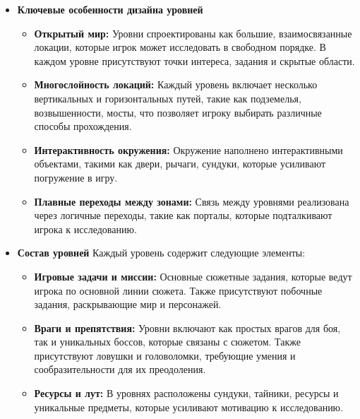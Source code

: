 \documentclass{article}
\begin{document}
\begin{itemize}
 \item \textbf{Ключевые особенности дизайна уровней}
\begin{itemize}
    \item \textbf{Открытый мир:} Уровни спроектированы как большие, взаимосвязанные локации, которые игрок может исследовать в свободном порядке. В каждом уровне присутствуют точки интереса, задания и скрытые области.
    \item \textbf{Многослойность локаций:} Каждый уровень включает несколько вертикальных и горизонтальных путей, такие как подземелья, возвышенности, мосты, что позволяет игроку выбирать различные способы прохождения.
    \item \textbf{Интерактивность окружения:} Окружение наполнено интерактивными объектами, такими как двери, рычаги, сундуки, которые усиливают погружение в игру.
    \item \textbf{Плавные переходы между зонами:} Связь между уровнями реализована через логичные переходы, такие как порталы, которые подталкивают игрока к исследованию.
\end{itemize}

 \item \textbf{Состав уровней}
Каждый уровень содержит следующие элементы:
\begin{itemize}
    \item \textbf{Игровые задачи и миссии:} Основные сюжетные задания, которые ведут игрока по основной линии сюжета. Также присутствуют побочные задания, раскрывающие мир и персонажей.
    \item \textbf{Враги и препятствия:} Уровни включают как простых врагов для боя, так и уникальных боссов, которые связаны с сюжетом. Также присутствуют ловушки и головоломки, требующие умения и сообразительности для их преодоления.
    \item \textbf{Ресурсы и лут:} В уровнях расположены сундуки, тайники, ресурсы и уникальные предметы, которые усиливают мотивацию к исследованию.
\end{itemize}


\end{itemize}
\end{document}
